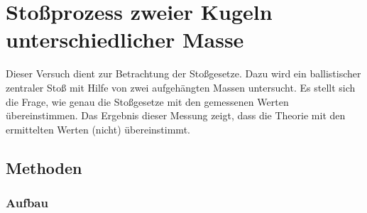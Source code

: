 \section{Stoßprozess zweier Kugeln unterschiedlicher Masse}
	
	Dieser Versuch dient zur Betrachtung der Stoßgesetze. Dazu wird ein ballistischer zentraler Stoß mit Hilfe von zwei aufgehängten Massen untersucht. Es stellt sich die Frage, wie genau die Stoßgesetze mit den gemessenen Werten übereinstimmen. Das Ergebnis dieser Messung zeigt, dass die Theorie mit den ermittelten Werten (nicht) übereinstimmt. %
	
	\subsection{Methoden}
		
		\subsubsection{Aufbau}
			
